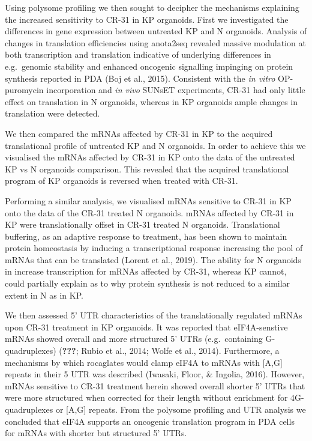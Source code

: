 \documentclass[12pt,openany]{book}
\begin{document}
Using polysome profiling we then sought to decipher the mechanisms
explaining the increased sensitivity to CR-31 in KP organoids. First we
investigated the differences in gene expression between untreated KP and
N organoids. Analysis of changes in translation efficiencies using
anota2seq revealed massive modulation at both transcription and
translation indicative of underlying differences in e.g.~genomic
stability and enhanced oncogenic signalling impinging on protein
synthesis reported in PDA (Boj et al., 2015). Consistent with the
\emph{in vitro} OP-puromycin incorporation and \emph{in vivo} SUNsET
experiments, CR-31 had only little effect on translation in N organoids,
whereas in KP organoids ample changes in translation were detected.

We then compared the mRNAs affected by CR-31 in KP to the acquired
translational profile of untreated KP and N organoids. In order to
achieve this we visualised the mRNAs affected by CR-31 in KP onto the
data of the untreated KP vs N organoids comparison. This revealed that
the acquired translational program of KP organoids is reversed when
treated with CR-31.

Performing a similar analysis, we visualised mRNAs sensitive to CR-31 in
KP onto the data of the CR-31 treated N organoids. mRNAs affected by
CR-31 in KP were translationally offset in CR-31 treated N organoids.
Translational buffering, as an adaptive response to treatment, has been
shown to maintain protein homeostasis by inducing a transcriptional
response increasing the pool of mRNAs that can be translated (Lorent et
al., 2019). The ability for N organoids in increase transcription for
mRNAs affected by CR-31, whereas KP cannot, could partially explain as
to why protein synthesis is not reduced to a similar extent in N as in
KP.

We then assessed 5' UTR characteristics of the translationally regulated
mRNAs upon CR-31 treatment in KP organoids. It was reported that
eIF4A-senstive mRNAs showed overall and more structured 5' UTRs
(e.g.~containing G-quadruplexes) ({\textbf{???}}; Rubio et al., 2014;
Wolfe et al., 2014). Furthermore, a mechanisms by which rocaglates would
clamp eIF4A to mRNAs with {[}A,G{]} repeats in their 5 UTR was described
(Iwasaki, Floor, \& Ingolia, 2016). However, mRNAs sensitive to CR-31
treatment herein showed overall shorter 5' UTRs that were more
structured when corrected for their length without enrichment for
4G-quadruplexes or {[}A,G{]} repeats. From the polysome profiling and
UTR analysis we concluded that eIF4A supports an oncogenic translation
program in PDA cells for mRNAs with shorter but structured 5' UTRs.
\end{document}
